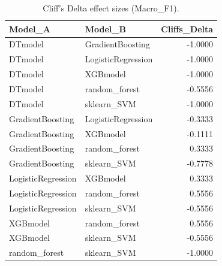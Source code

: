 \begin{table}[t]
\centering
\begin{tabular}{llr}
\toprule
Model_A & Model_B & Cliffs_Delta \\
\midrule
DTmodel & GradientBoosting & -1.0000 \\
DTmodel & LogisticRegression & -1.0000 \\
DTmodel & XGBmodel & -1.0000 \\
DTmodel & random_forest & -0.5556 \\
DTmodel & sklearn_SVM & -1.0000 \\
GradientBoosting & LogisticRegression & -0.3333 \\
GradientBoosting & XGBmodel & -0.1111 \\
GradientBoosting & random_forest & 0.3333 \\
GradientBoosting & sklearn_SVM & -0.7778 \\
LogisticRegression & XGBmodel & 0.3333 \\
LogisticRegression & random_forest & 0.5556 \\
LogisticRegression & sklearn_SVM & -0.5556 \\
XGBmodel & random_forest & 0.5556 \\
XGBmodel & sklearn_SVM & -0.5556 \\
random_forest & sklearn_SVM & -1.0000 \\
\bottomrule
\end{tabular}
\caption{Cliff's Delta effect sizes (Macro_F1).}
\label{tab:cliffs_Macro_F1}
\end{table}